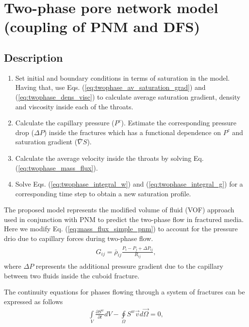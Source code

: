 \documentclass[a4paper,12pt]{extreport}
\begin{document}
\newpage
 \section*{Two-phase pore network model (coupling of  PNM and DFS)}
 
 \subsection*{Description} \label{s1}
 \begin{enumerate}
 	\item Set initial and boundary conditions in terms of saturation in the model. Having that, use Eqs. (\ref{eq:twophase_av_saturation_grad}) and (\ref{eq:twophase_dens_visc}) to calculate average saturation gradient, density and viscosity inside each of the throats. 
 	\item Calculate the capillary pressure ($P^c$). Estimate the corresponding pressure drop ($\Delta P$) inside the fractures which has a functional dependence on $P^c$ and saturation gradient ($\bar{\nabla} S$).
 	\item Calculate the average velocity inside the throats by solving Eq. (\ref{eq:twophase_mass_flux}).
 	\item Solve Eqs. (\ref{eq:twophase_integral_w}) and (\ref{eq:twophase_integral_g}) for a corresponding time step to obtain a new saturation profile.
 \end{enumerate}
 
 The proposed model represents the modified volume of fluid (VOF) approach used in conjunction with PNM to predict the two-phase flow in fractured media.  
 Here we modify Eq. (\ref{eq:mass_flux_simple_pnm}) to account for the pressure drio due to capillary forces during two-phase flow. 
 \begin{eqnarray}
 \begin{gathered}
 \label{eq:twophase_mass_flux}
 G_{ij} = \bar{\rho}_{ij} \frac{P_{i} - P_{j} + \Delta P_{ij}}{R_{ij}},
 \end{gathered}
 \end{eqnarray}
  where $\Delta P$ represents the additional pressure gradient due to the capillary between two fluids inside the cuboid fracture.
  
  The continuity equations for phases flowing through a system of fractures can be expressed as follows
  \begin{eqnarray}
  \label{eq:twophase_integral_w}
  \int \limits_{V} \frac{\partial S^w}{\partial t} d V - \oint \limits_{\Omega} S^w \vec{v} d\vec{\Omega} = 0,
  \end{eqnarray}
  
\end{document}
